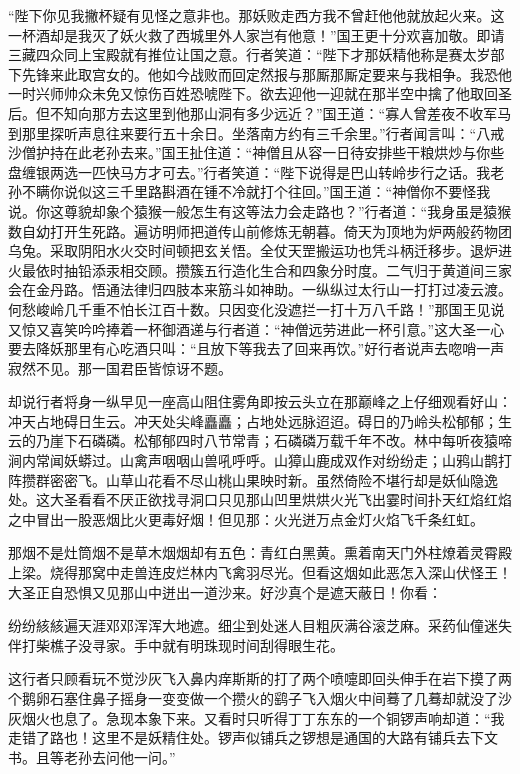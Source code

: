 \documentclass[12pt,UTF8]{ctexbook}
\begin{document}
“陛下你见我撇杯疑有见怪之意非也。那妖败走西方我不曾赶他他就放起火来。这一杯酒却是我灭了妖火救了西城里外人家岂有他意！”国王更十分欢喜加敬。即请三藏四众同上宝殿就有推位让国之意。行者笑道：“陛下才那妖精他称是赛太岁部下先锋来此取宫女的。他如今战败而回定然报与那厮那厮定要来与我相争。我恐他一时兴师帅众未免又惊伤百姓恐唬陛下。欲去迎他一迎就在那半空中擒了他取回圣后。但不知向那方去这里到他那山洞有多少远近？”国王道：“寡人曾差夜不收军马到那里探听声息往来要行五十余日。坐落南方约有三千余里。”行者闻言叫：“八戒沙僧护持在此老孙去来。”国王扯住道：“神僧且从容一日待安排些干粮烘炒与你些盘缠银两选一匹快马方才可去。”行者笑道：“陛下说得是巴山转岭步行之话。我老孙不瞒你说似这三千里路斟酒在锺不冷就打个往回。”国王道：“神僧你不要怪我说。你这尊貌却象个猿猴一般怎生有这等法力会走路也？”行者道：“我身虽是猿猴数自幼打开生死路。遍访明师把道传山前修炼无朝暮。倚天为顶地为炉两般药物团乌兔。采取阴阳水火交时间顿把玄关悟。全仗天罡搬运功也凭斗柄迁移步。退炉进火最依时抽铅添汞相交顾。攒簇五行造化生合和四象分时度。二气归于黄道间三家会在金丹路。悟通法律归四肢本来筋斗如神助。一纵纵过太行山一打打过凌云渡。何愁峻岭几千重不怕长江百十数。只因变化没遮拦一打十万八千路！”那国王见说又惊又喜笑吟吟捧着一杯御酒递与行者道：“神僧远劳进此一杯引意。”这大圣一心要去降妖那里有心吃酒只叫：“且放下等我去了回来再饮。”好行者说声去唿哨一声寂然不见。那一国君臣皆惊讶不题。

却说行者将身一纵早见一座高山阻住雾角即按云头立在那巅峰之上仔细观看好山：冲天占地碍日生云。冲天处尖峰矗矗；占地处远脉迢迢。碍日的乃岭头松郁郁；生云的乃崖下石磷磷。松郁郁四时八节常青；石磷磷万载千年不改。林中每听夜猿啼涧内常闻妖蟒过。山禽声咽咽山兽吼呼呼。山獐山鹿成双作对纷纷走；山鸦山鹊打阵攒群密密飞。山草山花看不尽山桃山果映时新。虽然倚险不堪行却是妖仙隐逸处。这大圣看看不厌正欲找寻洞口只见那山凹里烘烘火光飞出霎时间扑天红焰红焰之中冒出一股恶烟比火更毒好烟！但见那：火光迸万点金灯火焰飞千条红虹。

那烟不是灶筒烟不是草木烟烟却有五色：青红白黑黄。熏着南天门外柱燎着灵霄殿上梁。烧得那窝中走兽连皮烂林内飞禽羽尽光。但看这烟如此恶怎入深山伏怪王！大圣正自恐惧又见那山中迸出一道沙来。好沙真个是遮天蔽日！你看：

纷纷絯絯遍天涯邓邓浑浑大地遮。细尘到处迷人目粗灰满谷滚芝麻。采药仙僮迷失伴打柴樵子没寻家。手中就有明珠现时间刮得眼生花。

这行者只顾看玩不觉沙灰飞入鼻内痒斯斯的打了两个喷嚏即回头伸手在岩下摸了两个鹅卵石塞住鼻子摇身一变变做一个攒火的鹞子飞入烟火中间蓦了几蓦却就没了沙灰烟火也息了。急现本象下来。又看时只听得丁丁东东的一个铜锣声响却道：“我走错了路也！这里不是妖精住处。锣声似铺兵之锣想是通国的大路有铺兵去下文书。且等老孙去问他一问。”
\end{document}
